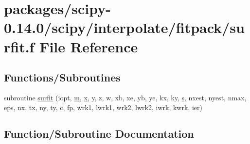 \hypertarget{surfit_8f}{}\section{packages/scipy-\/0.14.0/scipy/interpolate/fitpack/surfit.f File Reference}
\label{surfit_8f}
\subsection*{Functions/\+Subroutines}
\begin{DoxyCompactItemize}
\item 
subroutine \hyperlink{surfit_8f_a016209a48e5aeadd95ec88199837694c}{surfit} (iopt, \hyperlink{indexexpr_8h_ab72fdb4031d47b75ab26dd18a437bcdc}{m}, \hyperlink{vecnorm1_8cc_ac73eed9e41ec09d58f112f06c2d6cb63}{x}, y, z, w, xb, xe, yb, ye, kx, ky, \hyperlink{indexexpr_8h_ae024b0db549122b44c349ae28ec990dc}{s}, nxest, nyest, nmax, eps, nx, tx, ny, ty, c, fp, wrk1, lwrk1, wrk2, lwrk2, iwrk, kwrk, ier)
\end{DoxyCompactItemize}


\subsection{Function/\+Subroutine Documentation}
\hypertarget{surfit_8f_a016209a48e5aeadd95ec88199837694c}{}
